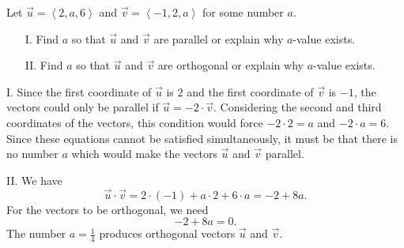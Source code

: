 \documentclass[noauthor,handout]{ximera}
\begin{document}

\begin{problem}
Let $\vec{u} = \left<2,a,6\right>$ and $\vec{v} = \left<-1,2,a\right>$ for some number $a$. 
\begin{itemize}
\item[I.] Find $a$ so that $\vec{u}$ and $\vec{v}$ are parallel or explain why $a$-value exists.
\item[II.] Find $a$ so that $\vec{u}$ and $\vec{v}$ are orthogonal or explain why $a$-value exists.
\end{itemize}

\begin{freeResponse}
I. Since the first coordinate of $\vec{u}$ is $2$ and the first coordinate of $\vec{v}$ is $-1$, the vectors could only be parallel if $\vec{u} = -2 \cdot \vec{v}$. Considering the second and third coordinates of the vectors, this condition would force $-2 \cdot 2 = a$ and $-2 \cdot a = 6$. Since these equations cannot be satisfied simultaneously, it must be that there is no number $a$ which would make the vectors $\vec{u}$ and $\vec{v}$ parallel.

II. We have
$$
\vec{u} \cdot \vec{v} = 2 \cdot (-1) + a \cdot 2 + 6 \cdot a = -2 + 8a.
$$
For the vectors to be orthogonal, we need
$$
-2 + 8 a = 0.
$$
The number $a = \frac{1}{4}$ produces orthogonal vectors $\vec{u}$ and $\vec{v}$. 
\end{freeResponse}
\end{problem}

\end{document}
